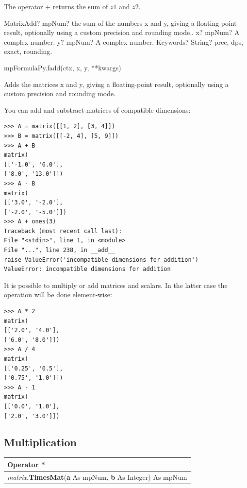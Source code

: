 \vspace{0.3cm}
The operator $+$ returns the sum of $z1$ and $z2$.


\vspace{0.3cm}
\begin{mpFunctionsExtract}
	\mpFunctionThree
	{MatrixAdd? mpNum? the sum of the numbers x and y, giving a floating-point result, optionally using a custom precision and rounding mode..}
	{x? mpNum? A complex number.}
	{y? mpNum? A complex number.}
	{Keywords? String? prec, dps, exact, rounding.}	
\end{mpFunctionsExtract}

\vspace{0.3cm}

mpFormulaPy.fadd(ctx, x, y, **kwargs)

\vpara
Adds the matrices x and y, giving a floating-point result, optionally using a custom precision and rounding mode.


You can add and substract matrices of compatible dimensions:

\begin{lstlisting}
>>> A = matrix([[1, 2], [3, 4]])
>>> B = matrix([[-2, 4], [5, 9]])
>>> A + B
matrix(
[['-1.0', '6.0'],
['8.0', '13.0']])
>>> A - B
matrix(
[['3.0', '-2.0'],
['-2.0', '-5.0']])
>>> A + ones(3)
Traceback (most recent call last):
File "<stdin>", line 1, in <module>
File "...", line 238, in __add__
raise ValueError('incompatible dimensions for addition')
ValueError: incompatible dimensions for addition
\end{lstlisting}

It is possible to multiply or add matrices and scalars. In the latter case the operation will be done element-wise:

\begin{lstlisting}
>>> A * 2
matrix(
[['2.0', '4.0'],
['6.0', '8.0']])
>>> A / 4
matrix(
[['0.25', '0.5'],
['0.75', '1.0']])
>>> A - 1
matrix(
[['0.0', '1.0'],
['2.0', '3.0']])
\end{lstlisting}





\subsection{Multiplication}
\begin{tabular}{p{481pt}}
	\toprule
	\textsf{Operator \textbf{*}}\index{Multiprecision Functions!*} \\
	\midrule
	\textsf{\textit{matrix}\textbf{.TimesMat}(\textbf{a} As mpNum, \textbf{b} As Integer) As mpNum}\index{Multiprecision Functions!.TimesMat} \\
	\bottomrule
\end{tabular}

